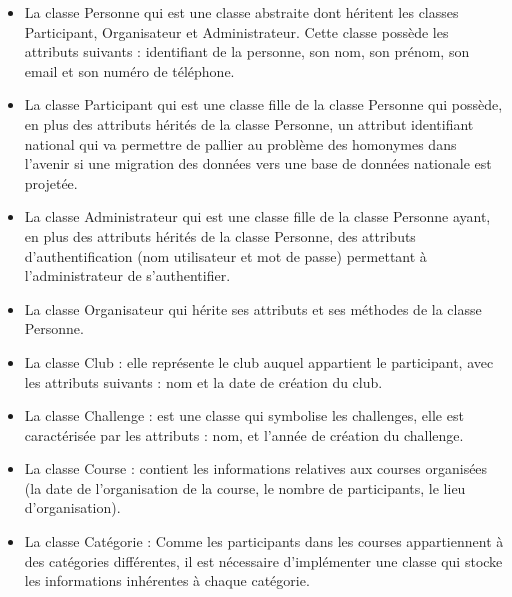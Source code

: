 \documentclass[12pt,a4paper]{report}
\begin{document}
\begin{itemize} 
 	\item La classe Personne qui est une classe abstraite dont héritent les classes Participant, Organisateur et Administrateur. Cette classe possède les attributs suivants : identifiant de la personne, son nom, son prénom, son email et son numéro de téléphone.
 	\item La classe Participant qui est une classe fille de la classe Personne qui possède, en plus des attributs hérités de la classe Personne, un attribut identifiant national qui va permettre de pallier au problème des homonymes dans l’avenir si une migration des données vers une base de données nationale est projetée.
 	\item La classe Administrateur qui est une classe fille de la classe Personne ayant, en plus des attributs hérités de la classe Personne, des attributs d’authentification (nom utilisateur et mot de passe) permettant à l’administrateur de s’authentifier. 
 	\item La classe Organisateur qui hérite ses attributs et ses méthodes de la classe Personne.
 	\item La classe Club : elle représente le club auquel appartient le participant, avec les attributs suivants : nom et la date de création du club.
 	\item La classe Challenge : est une classe qui symbolise les challenges, elle est caractérisée par les attributs : nom, et l’année de création du challenge.
 	\item La classe Course : contient les informations relatives aux courses organisées (la date de l’organisation de la course, le nombre de participants, le lieu d’organisation).
 	\item La classe Catégorie : Comme les participants dans les courses appartiennent à des catégories différentes, il est nécessaire d’implémenter une classe qui stocke les informations inhérentes à chaque catégorie. 
\end{itemize} 
\end{document}
